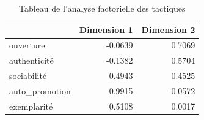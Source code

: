 \begin{table}
\caption{Tableau de l'analyse factorielle des tactiques}
\label{tab: tactics_fa}
\begin{tabular}{lrr}
\toprule
 & Dimension 1 & Dimension 2 \\
\midrule
ouverture & -0.0639 & 0.7069 \\
authenticité & -0.1382 & 0.5704 \\
sociabilité & 0.4943 & 0.4525 \\
auto\_promotion & 0.9915 & -0.0572 \\
exemplarité & 0.5108 & 0.0017 \\
\bottomrule
\end{tabular}
\end{table}
